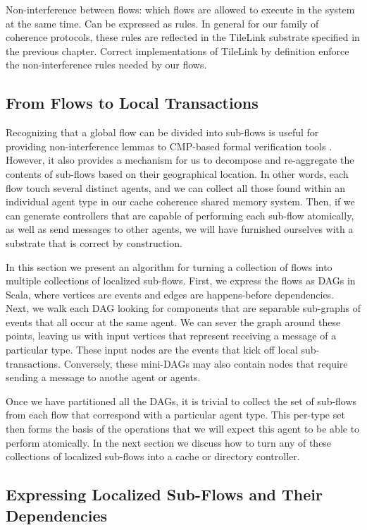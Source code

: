 Non-interference between flows: which flows are allowed to execute in the system at the same time.
Can be expressed as rules.
In general for our family of coherence protocols, these rules are reflected in the TileLink substrate specified in the previous chapter.
Correct implementations of TileLink by definition enforce the non-interference rules needed by our flows.

\subsection{From Flows to Local Transactions}

Recognizing that a global flow can be divided into sub-flows is useful for providing non-interference lemmas to CMP-based formal verification tools \cite{}.
However, it also provides a mechanism for us to decompose and re-aggregate the contents of sub-flows based on their geographical location.
In other words, each flow touch several distinct agents, and we can collect all those found within an individual agent type in our cache coherence shared memory system.
Then, if we can generate controllers that are capable of performing each sub-flow atomically, as well as send messages to other agents,
we will have furnished ourselves with a substrate that is correct by construction.

In this section we present an algorithm for turning a collection of flows into multiple collections of localized sub-flows.
First, we express the flows as DAGs in Scala, where vertices are events and edges are happens-before dependencies.
Next, we walk each DAG looking for components that are separable sub-graphs of events that all occur at the same agent.
We can sever the graph around these points, leaving us with input vertices that represent receiving a message of a particular type.
These input nodes are the events that kick off local sub-transactions.
Conversely, these mini-DAGs may also contain nodes that require sending a message to anothe agent or agents.

Once we have partitioned all the DAGs, it is trivial to collect the set of sub-flows from each flow that correspond with a particular agent type.
This per-type set then forms the basis of the operations that we will expect this agent to be able to perform atomically.
In the next section we discuss how to turn any of these collections of localized sub-flows into a cache or directory controller.

\subsection{Expressing Localized Sub-Flows and Their Dependencies}

